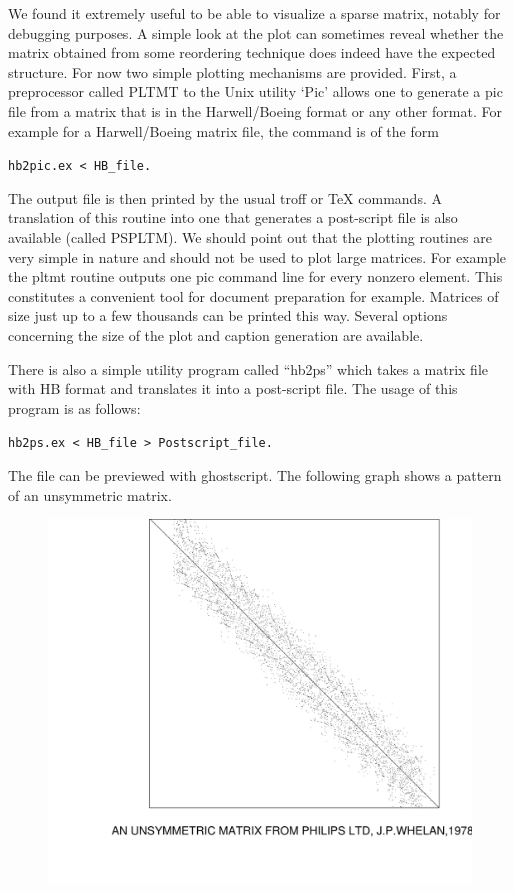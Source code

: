 \documentclass[12pt]{article}
\begin{document}
We found it extremely useful to be able to visualize a sparse matrix,
notably for debugging purposes.  A simple look at the plot can
sometimes reveal whether the matrix obtained from some reordering
technique does indeed have the expected structure.  For now two simple
plotting mechanisms are provided. First, a preprocessor called PLTMT
to the Unix utility `Pic'  allows one to generate a pic file from a
matrix that is in the Harwell/Boeing format or any other format. For
example for a Harwell/Boeing matrix file, the command is of the form
\begin{center}
{\tt hb2pic.ex < HB\_file.}
\end{center}
The output file is then printed by the usual troff or TeX commands. A
translation of this routine into one that generates a post-script file
is also available (called PSPLTM). We should point out that the
plotting routines are very simple in nature and should not be used to
plot large matrices. For example the pltmt routine outputs one pic
command line for every nonzero element.  This constitutes a convenient
tool for document preparation for example.  Matrices of size just up
to a few thousands can be printed this way.  Several options
concerning the size of the plot and caption generation are available.

There is also a simple utility program called ``hb2ps'' which takes a
matrix file with HB format and translates it into a post-script file.
The usage of this program is as follows:
\begin{center}
{\tt hb2ps.ex < HB\_file > Postscript\_file.}
\end{center}
The file can be previewed with ghostscript.
The following graph shows a pattern of an unsymmetric matrix.

\begin{figure}[htb]
\includegraphics[width=5in]{jpwh}
\end{figure}
\end{document}
